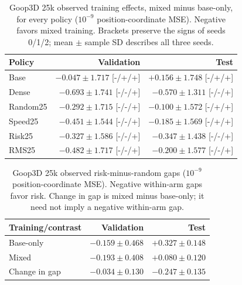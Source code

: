\begin{table}[!ht]
\centering\small
\setlength{\tabcolsep}{5pt}\renewcommand{\arraystretch}{1.12}
\caption{Goop3D 25k observed training effects, mixed minus base-only, for every policy ($10^{-9}$ position-coordinate MSE). Negative favors mixed training. Brackets preserve the signs of seeds 0/1/2; mean $\pm$ sample SD describes all three seeds.}
\label{tab:goop3d25k-observed-position-training}
\begin{tabular}{lrr}
\toprule
Policy & Validation & Test\\
\midrule
Base & $-0.047\pm1.717$ [-/+/+] & $+0.156\pm1.748$ [-/+/+]\\
Dense & $-0.693\pm1.741$ [-/-/+] & $-0.570\pm1.311$ [-/-/+]\\
Random25 & $-0.292\pm1.715$ [-/-/+] & $-0.100\pm1.572$ [-/+/+]\\
Speed25 & $-0.451\pm1.544$ [-/-/+] & $-0.185\pm1.569$ [-/+/+]\\
Risk25 & $-0.327\pm1.586$ [-/-/+] & $-0.347\pm1.438$ [-/-/+]\\
RMS25 & $-0.482\pm1.717$ [-/-/+] & $-0.200\pm1.577$ [-/-/+]\\
\bottomrule
\end{tabular}
\end{table}

\begin{table}[!ht]
\centering\small
\setlength{\tabcolsep}{5pt}\renewcommand{\arraystretch}{1.12}
\caption{Goop3D 25k observed risk-minus-random gaps ($10^{-9}$ position-coordinate MSE). Negative within-arm gaps favor risk. Change in gap is mixed minus base-only; it need not imply a negative within-arm gap.}
\label{tab:goop3d25k-observed-position-contrasts}
\begin{tabular}{lrr}
\toprule
Training/contrast & Validation & Test\\
\midrule
Base-only & $-0.159\pm0.468$ & $+0.327\pm0.148$\\
Mixed & $-0.193\pm0.408$ & $+0.080\pm0.120$\\
Change in gap & $-0.034\pm0.130$ & $-0.247\pm0.135$\\
\bottomrule
\end{tabular}
\end{table}
